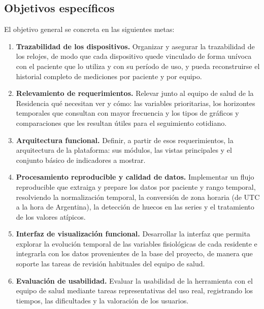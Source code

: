 \documentclass[12pt,a4paper]{article}
\begin{document}
    \subsection{Objetivos específicos}
    El objetivo general se concreta en las siguientes metas:
    \begin{enumerate}
        \item \textbf{Trazabilidad de los dispositivos.} Organizar y asegurar la trazabilidad de los relojes, de modo que cada dispositivo quede vinculado de forma unívoca con el paciente que lo utiliza y con su período de uso, y pueda reconstruirse el historial completo de mediciones por paciente y por equipo.

        \item \textbf{Relevamiento de requerimientos.} Relevar junto al equipo de salud de la Residencia qué necesitan ver y cómo: las variables prioritarias, los horizontes temporales que consultan con mayor frecuencia y los tipos de gráficos y comparaciones que les resultan útiles para el seguimiento cotidiano.

        \item \textbf{Arquitectura funcional.} Definir, a partir de esos requerimientos, la arquitectura de la plataforma: sus módulos, las vistas principales y el conjunto básico de indicadores a mostrar.

        \item \textbf{Procesamiento reproducible y calidad de datos.} Implementar un flujo reproducible que extraiga y prepare los datos por paciente y rango temporal, resolviendo la normalización temporal, la conversión de zona horaria (de UTC a la hora de Argentina), la detección de huecos en las series y el tratamiento de los valores atípicos.

        \item \textbf{Interfaz de visualización funcional.} Desarrollar la interfaz que permita explorar la evolución temporal de las variables fisiológicas de cada residente e integrarla con los datos provenientes de la base del proyecto, de manera que soporte las tareas de revisión habituales del equipo de salud.

        

        \item \textbf{Evaluación de usabilidad.} Evaluar la usabilidad de la herramienta con el equipo de salud mediante tareas representativas del uso real, registrando los tiempos, las dificultades y la valoración de los usuarios.
    \end{enumerate}
\end{document}
